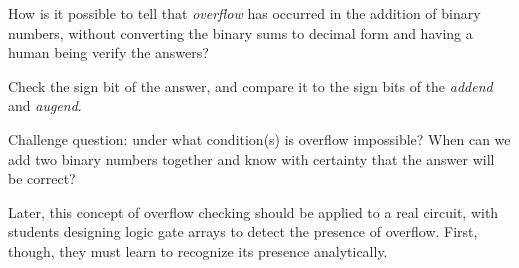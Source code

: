 

How is it possible to tell that {\it overflow} has occurred in the addition of binary numbers, without converting the binary sums to decimal form and having a human being verify the answers?







Check the sign bit of the answer, and compare it to the sign bits of the {\it addend} and {\it augend}.

\vskip 10pt

Challenge question: under what condition(s) is overflow impossible?  When can we add two binary numbers together and know with certainty that the answer will be correct?







Later, this concept of overflow checking should be applied to a real circuit, with students designing logic gate arrays to detect the presence of overflow.  First, though, they must learn to recognize its presence analytically.




